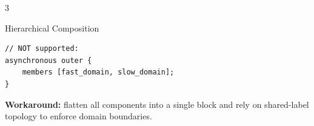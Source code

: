 \begin{multicols}{3}
\begin{warnbox}{Hierarchical Composition}
\begin{lstlisting}[style=ctxdsl]
// NOT supported:
asynchronous outer {
    members [fast_domain, slow_domain];
}
\end{lstlisting}

\textbf{Workaround:} flatten all components into a single
 block and rely on shared-label topology
to enforce domain boundaries.
\end{warnbox}

\end{multicols}


